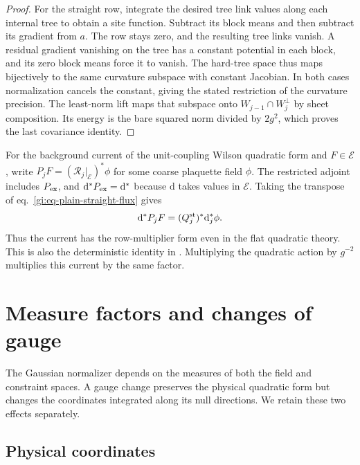 \documentclass[11pt,letterpaper,reqno]{amsart}
\numberwithin{equation}{section}
\renewcommand{\eqref}[1]{\textup{eq.~\ref{#1}}}
\theoremstyle{definition}
\theoremstyle{remark}
\begin{document}
\begin{proof}
For the straight row, integrate the desired tree link values
along each internal tree to obtain a site function. Subtract its
block means and then subtract its gradient from $a$. The row stays
zero, and the resulting tree links vanish. A residual gradient
vanishing on the tree has a constant potential in each block, and
its zero block means force it to vanish. The hard-tree space thus
maps bijectively to the same curvature subspace with constant
Jacobian. In both cases normalization cancels the constant, giving
the stated restriction of the curvature precision. The least-norm
lift maps that subspace onto $W_{j-1}\cap W_j^\perp$ by sheet
composition. Its energy is the bare squared norm divided by
$2g^2$, which proves the last covariance identity.
\end{proof}

For the background current of the unit-coupling Wilson
quadratic form and $F\in\mathcal E$, write
$P_jF=(\mathcal R_j|_{\mathcal E})^*\phi$ for some coarse
plaquette field $\phi$. The restricted adjoint includes
$P_{\rm ex}$, and $\mathrm d^*P_{\rm ex}=\mathrm d^*$
because $\mathrm d$ takes values in $\mathcal E$. Taking the transpose of
\eqref{gi:eq-plain-straight-flux} gives
\begin{equation}\label{gi:eq-free-background-current}
     \mathrm d^* P_jF
          =(Q_j^{\rm st})^*\mathrm d_j^*\phi .
\end{equation}
Thus the current has the row-multiplier form even in the flat
quadratic theory. This is also the deterministic identity in
\cite[The deterministic curvature slices]{MB}.
Multiplying the quadratic action by $g^{-2}$ multiplies
this current by the same factor.

\section{Measure factors and changes of gauge}
\label{gi:sec-gauge-measures}

The Gaussian normalizer depends on the measures of both the field
and constraint spaces. A gauge change preserves the physical
quadratic form but changes the coordinates integrated along its
null directions. We retain these two effects separately.

\subsection{Physical coordinates}
\end{document}
